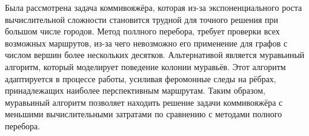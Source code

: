 Была рассмотрена задача коммивояжёра, которая из-за экспоненциального роста вычислительной сложности становится трудной для точного решения при большом числе городов. Метод поллного перебора, требует проверки всех возможных маршрутов, из-за чего невозможно его применение для графов с числом вершин более нескольких десятков.
Альтернативой является муравьиный алгоритм, который моделирует поведение колонии муравьёв. Этот алгоритм адаптируется в процессе работы, усиливая феромонные следы на рёбрах, принадлежащих наиболее перспективным маршрутам. Таким образом, муравьиный алгоритм позволяет находить решение задачи коммивояжёра с меньшими вычислительными затратами по сравнению с методами полного перебора.